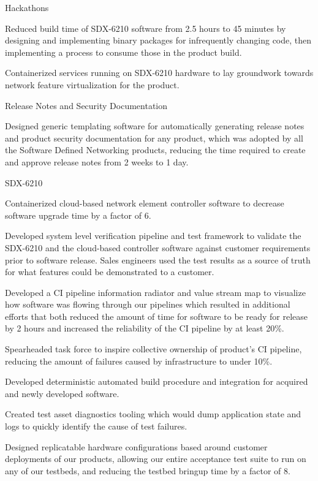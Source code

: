 
\begin{cventries}
  \cventry
    {} {Hackathons} {} {} {
      \begin{cvitems}
      \item {Reduced build time of SDX-6210 software from 2.5 hours to 45 minutes by designing and implementing binary packages for infrequently changing code, then implementing a process to consume those in the product build.}
      \item {Containerized services running on SDX-6210 hardware to lay groundwork towards network feature virtualization for the product.}
      \end{cvitems}
    }

  \cventry
    {} {Release Notes and Security Documentation} {} {} {
      \begin{cvitems}
        \item {Designed generic templating software for automatically generating release notes and product security documentation for any product, which was adopted by all the Software Defined Networking products, reducing the time required to create and approve release notes from 2 weeks to 1 day.}
      \end{cvitems}
    }

  \cventry
    {} {SDX-6210} {} {} {
      \begin{cvitems} %
        \item {Containerized cloud-based network element controller software to decrease software upgrade time by a factor of 6.}
        \item {Developed system level verification pipeline and test framework to validate the SDX-6210 and the cloud-based controller software against customer requirements prior to software release. Sales engineers used the test results as a source of truth for what features could be demonstrated to a customer.}
        \item {Developed a CI pipeline information radiator and value stream map to visualize how software was flowing through our pipelines which resulted in additional efforts that both reduced the amount of time for software to be ready for release by 2 hours and increased the reliability of the CI pipeline by at least 20\%.}
        \item {Spearheaded task force to inspire collective ownership of product's CI pipeline, reducing the amount of failures caused by infrastructure to under 10\%.}
        \item {Developed deterministic automated build procedure and integration for acquired and newly developed software.}
        \item {Created test asset diagnostics tooling which would dump application state and logs to quickly identify the cause of test failures.}
        \item {Designed replicatable hardware configurations based around customer deployments of our products, allowing our entire acceptance test suite to run on any of our testbeds, and reducing the testbed bringup time by a factor of 8.}
      \end{cvitems}
    }


\end{cventries}
